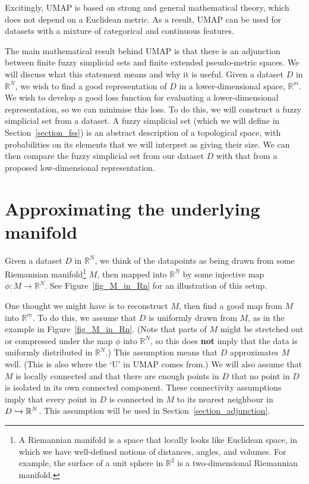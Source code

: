 \documentclass[a4paper,11pt,leqno]{article} \usepackage{amsmath}
\newcommand{\RR}{\mathbb{R}} \newcommand{\QQ}{\mathbb{Q}}
\theoremstyle{definition} \newtheorem{defn}{Definition}
\begin{document}
Excitingly, UMAP is based on strong and general mathematical theory, which does
not depend on a Euclidean metric.
As a result, UMAP can be used for datasets with a mixture of categorical and
continuous features.

The main mathematical result behind UMAP is that there is an adjunction between
finite fuzzy simplicial sets and finite extended pseudo-metric spaces.
We will discuss what this statement means and why it is useful.
Given a dataset $D$ in $\RR^N$, we wish to find a good representation of $D$ in
a lower-dimensional space, $\RR^m$.
We wish to develop a good loss function for evaluating a lower-dimensional
representation, so we can minimise this loss.
To do this, we will construct a fuzzy simplicial set from a dataset.
A fuzzy simplicial set (which we will define in Section~\ref{section_fss}) is
an abstract description of a topological space, with probabilities on its
elements that we will interpret as giving their size.
We can then compare the fuzzy simplicial set from our dataset $D$ with that
from a proposed low-dimensional representation.

\section{Approximating the underlying manifold}
\label{section_uniform}

Given a dataset $D$ in $\RR^N$, we think of the datapoints as being drawn from
some Riemannian manifold\footnote{
  A Riemannian manifold is a space that locally looks like Euclidean space, in
  which we have well-defined notions of distances, angles, and volumes.
  For example, the surface of a unit sphere in $\RR^3$ is a two-dimensional
  Riemannian manifold.
} $M$, then mapped into $\RR^N$ by some injective map $\phi: M\to\RR^N$.
See Figure~\ref{fig_M_in_Rn} for an illustration of this setup.

One thought we might have is to reconstruct $M$, then find a good map from $M$
into $\RR^m$.  To do this, we assume that $D$ is uniformly drawn from $M$, as in
the example in Figure~\ref{fig_M_in_Rn}. (Note that parts of $M$ might be
stretched out or compressed under the map $\phi$ into $\RR^N$, so this does
{\textbf{not}} imply that the data is uniformly distributed in $\RR^N$.) This
assumption means that $D$ approximates $M$ well.  (This is also where the `U' in
UMAP comes from.) We will also assume that $M$ is locally connected and that
there are enough points in $D$ that no point in $D$ is isolated in its own
connected component.  These connectivity assumptions imply that every point in
$D$ is connected in $M$ to its nearest neighbour in $D\inj \RR^N$.  This
assumption will be used in Section~\ref{section_adjunction}.
\end{document}
